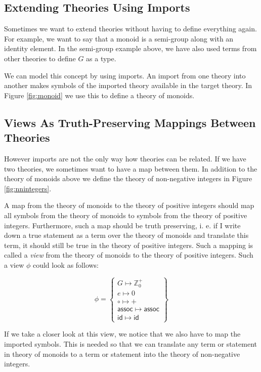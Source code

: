 \subsection{Extending Theories Using Imports}

Sometimes we want to extend theories without having to define everything again. For example, we want to say that a monoid is a semi-group along with an identity element. In the semi-group example above, we have also used terms from other theories to define $G$ as a type.

We can model this concept by using imports. An import from one theory into another makes symbols of the imported theory available in the target theory. In Figure \ref{fig:monoid} we use this to define a theory of monoids.



\subsection{Views As Truth-Preserving Mappings Between Theories}

However imports are not the only way how theories can be related. If we have two theories, we sometimes want to have a map between them. In addition to the theory of monoids above we define the theory of non-negative integers in Figure \ref{fig:nnintegers}.



A map from the theory of monoids to the theory of positive integers should map all symbols from the theory of monoids to symbols from the theory of positive integers. Furthermore, such a map should be truth preserving, i. e. if I write down a true statement as a term over the theory of monoids and translate this term, it should still be true  in the theory of positive integers. Such a mapping is called a \textit{view} from the theory of monoids to the theory of positive integers. Such a view $\phi$ could look as follows:

\[
  \phi=\left\{\begin{array}{l}
  G \mapsto \mathbb{Z}^{+}_{0}\\
  e \mapsto 0\\
  \circ \mapsto +\\
  \mathsf{assoc} \mapsto \mathsf{assoc}\\
  \mathsf{id} \mapsto \mathsf{id}
  \end{array}\right\}
\]

If we take a closer look at this view, we notice that we also have to map the imported symbols. This is needed so that we can translate any term or statement in theory of monoids to a term or statement into the theory of non-negative integers.

